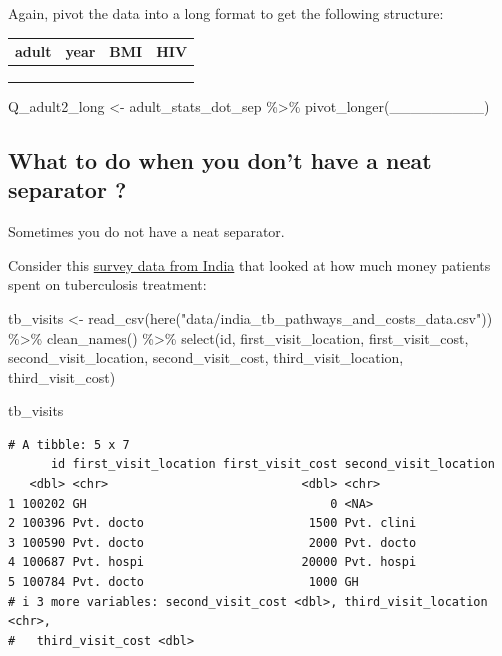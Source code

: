 \documentclass[
  letterpaper,
  DIV=11,
  numbers=noendperiod]{scrreprt}
\newenvironment{Shaded}{\begin{snugshade}}{\end{snugshade}}
\newcommand{\FunctionTok}[1]{\textcolor[rgb]{0.28,0.35,0.67}{#1}}
\newcommand{\NormalTok}[1]{\textcolor[rgb]{0.00,0.23,0.31}{#1}}
\newcommand{\OtherTok}[1]{\textcolor[rgb]{0.00,0.23,0.31}{#1}}
\newcommand{\SpecialCharTok}[1]{\textcolor[rgb]{0.37,0.37,0.37}{#1}}
\newcommand{\StringTok}[1]{\textcolor[rgb]{0.13,0.47,0.30}{#1}}
\begin{document}
\begin{tcolorbox}
Again, pivot the data into a long format to get the following structure:

\begin{longtable}[]{@{}llll@{}}
\toprule\noalign{}
adult & year & BMI & HIV \\
\midrule\noalign{}
\endhead
\bottomrule\noalign{}
\endlastfoot
& & & \\
& & & \\
& & & \\
\end{longtable}

\begin{Shaded}
\begin{Highlighting}[]
\NormalTok{Q\_adult2\_long }\OtherTok{\textless{}{-}}
\NormalTok{  adult\_stats\_dot\_sep }\SpecialCharTok{\%\textgreater{}\%}
  \FunctionTok{pivot\_longer}\NormalTok{(\_\_\_\_\_\_\_\_\_)}
\end{Highlighting}
\end{Shaded}

\end{tcolorbox}

\subsection{What to do when you don't have a neat separator
?}\label{what-to-do-when-you-dont-have-a-neat-separator}

Sometimes you do not have a neat separator.

Consider this \href{https://zenodo.org/record/5014153}{survey data from
India} that looked at how much money patients spent on tuberculosis
treatment:

\begin{Shaded}
\begin{Highlighting}[]
\NormalTok{tb\_visits }\OtherTok{\textless{}{-}} \FunctionTok{read\_csv}\NormalTok{(}\FunctionTok{here}\NormalTok{(}\StringTok{"data/india\_tb\_pathways\_and\_costs\_data.csv"}\NormalTok{)) }\SpecialCharTok{\%\textgreater{}\%} 
  \FunctionTok{clean\_names}\NormalTok{() }\SpecialCharTok{\%\textgreater{}\%} 
  \FunctionTok{select}\NormalTok{(id, first\_visit\_location, first\_visit\_cost, second\_visit\_location, second\_visit\_cost, third\_visit\_location, third\_visit\_cost)}

\NormalTok{tb\_visits}
\end{Highlighting}
\end{Shaded}

\begin{verbatim}
# A tibble: 5 x 7
      id first_visit_location first_visit_cost second_visit_location
   <dbl> <chr>                           <dbl> <chr>                
1 100202 GH                                  0 <NA>                 
2 100396 Pvt. docto                       1500 Pvt. clini           
3 100590 Pvt. docto                       2000 Pvt. docto           
4 100687 Pvt. hospi                      20000 Pvt. hospi           
5 100784 Pvt. docto                       1000 GH                   
# i 3 more variables: second_visit_cost <dbl>, third_visit_location <chr>,
#   third_visit_cost <dbl>
\end{verbatim}
\end{document}
